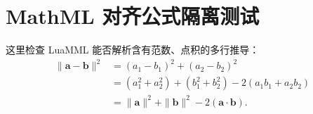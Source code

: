 \documentclass[11pt,a4paper,UTF8]{ctexart}
\newcommand{\vect}[1]{\boldsymbol{#1}}
\begin{document}
\section{MathML 对齐公式隔离测试}
这里检查 LuaMML 能否解析含有范数、点积的多行推导：
\begin{align*}
\|\vect a-\vect b\|^2
&=(a_1-b_1)^2+(a_2-b_2)^2\\
&=(a_1^2+a_2^2)+(b_1^2+b_2^2)
-2(a_1b_1+a_2b_2)\\
&=\|\vect a\|^2+\|\vect b\|^2
-2(\vect a\cdot\vect b).
\end{align*}
\end{document}
